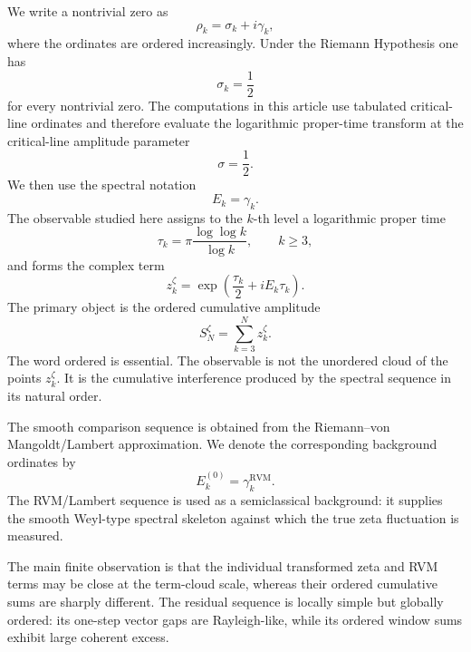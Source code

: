 \documentclass[11pt]{amsart}
\numberwithin{equation}{section}
\theoremstyle{plain}
\theoremstyle{definition}
\theoremstyle{remark}
\newcommand{\RVM}{\mathrm{RVM}}
\begin{document}
We write a nontrivial zero as
\begin{equation}
\rho_k
=
\sigma_k+i\gamma_k,
\label{eq:introduction_zero_definition}
\end{equation}
where the ordinates are ordered increasingly.  Under the Riemann Hypothesis one has
\begin{equation}
\sigma_k
=
\frac{1}{2}
\label{eq:introduction_rh_sigma_value}
\end{equation}
for every nontrivial zero.  The computations in this article use tabulated critical-line ordinates and therefore evaluate the logarithmic proper-time transform at the critical-line amplitude parameter
\begin{equation}
\sigma
=
\frac{1}{2}.
\label{eq:introduction_computational_sigma}
\end{equation}
We then use the spectral notation
\begin{equation}
E_k=\gamma_k.
\label{eq:introduction_energy_identification}
\end{equation}
The observable studied here assigns to the \(k\)-th level a logarithmic proper time
\begin{equation}
\tau_k
=
\pi\frac{\log\log k}{\log k},
\qquad k\geq 3,
\label{eq:introduction_proper_time}
\end{equation}
and forms the complex term
\begin{equation}
z_k^\zeta
=
\exp\left(\frac{\tau_k}{2}+iE_k\tau_k\right).
\label{eq:introduction_transformed_term}
\end{equation}
The primary object is the ordered cumulative amplitude
\begin{equation}
S_N^\zeta
=
\sum_{k=3}^{N}z_k^\zeta.
\label{eq:introduction_primary_sum}
\end{equation}
The word ordered is essential.  The observable is not the unordered cloud of the points \(z_k^\zeta\).  It is the cumulative interference produced by the spectral sequence in its natural order.

The smooth comparison sequence is obtained from the Riemann--von Mangoldt/Lambert approximation.  We denote the corresponding background ordinates by
\begin{equation}
E_k^{(0)}=\gamma_k^{\RVM}.
\label{eq:introduction_rvm_background}
\end{equation}
The RVM/Lambert sequence is used as a semiclassical background: it supplies the smooth Weyl-type spectral skeleton against which the true zeta fluctuation is measured.

The main finite observation is that the individual transformed zeta and RVM terms may be close at the term-cloud scale, whereas their ordered cumulative sums are sharply different.  The residual sequence is locally simple but globally ordered: its one-step vector gaps are Rayleigh-like, while its ordered window sums exhibit large coherent excess.
\end{document}
